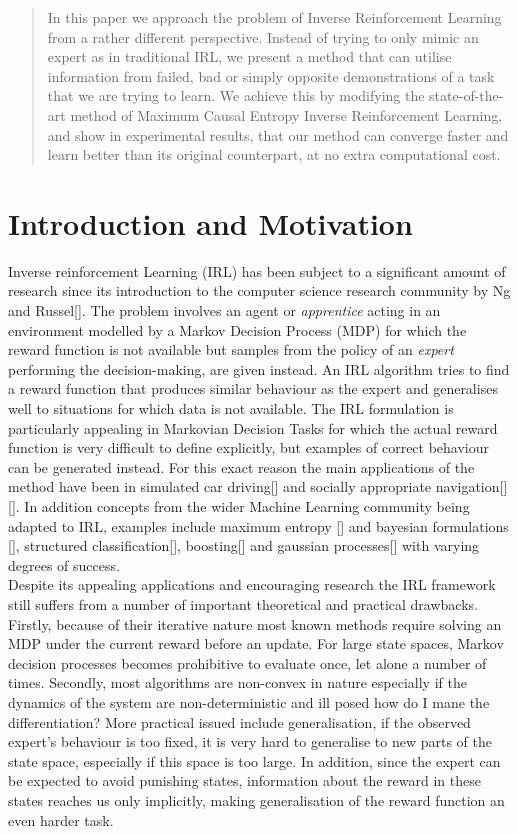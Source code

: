 \documentclass[conference]{IEEEtran}
\begin{document}
\begin{abstract}
In this paper we approach the problem of Inverse Reinforcement Learning from a rather different perspective. Instead of trying to only mimic an expert as in 
traditional IRL, we present a method that can utilise information from failed, bad or simply opposite demonstrations of a task that we are trying to learn. 
We achieve this by modifying the state-of-the-art method of Maximum Causal Entropy Inverse Reinforcement Learning, and show in experimental results, that our
method can converge faster and learn better than its original counterpart, at no extra computational cost. 
\end{abstract}

\IEEEpeerreviewmaketitle

\section{Introduction and Motivation}
Inverse reinforcement Learning (IRL) has been subject to a significant amount of research since its introduction to the computer science research community by Ng and Russel[]. The problem involves an agent or \emph{apprentice} acting in an environment modelled by a Markov Decision Process (MDP) for which the reward function is not available but samples from the policy of an \emph{expert} performing the decision-making, are given instead. An IRL algorithm tries to find a reward function that produces similar behaviour as the expert and generalises well to situations for which data is not available. The IRL formulation is particularly appealing in Markovian Decision Tasks for which the actual reward function is very difficult to define explicitly, but examples of correct behaviour can be generated instead. For this exact reason the main applications of the method have been in simulated car driving[] and socially appropriate navigation[][]. In addition concepts from the wider Machine Learning community being adapted to IRL, examples include maximum entropy [] and bayesian formulations [], structured classification[], boosting[] and gaussian processes[] with varying degrees of success.\\

Despite its appealing applications and encouraging research the IRL framework still suffers from a number of important theoretical and practical drawbacks. Firstly, because of their iterative nature most known methods require solving an MDP under the current reward before an update. For large state spaces, Markov decision processes becomes prohibitive to evaluate once, let alone a number of times. Secondly, most algorithms are non-convex in nature especially if the dynamics of the system are non-deterministic and ill posed how do I mane the differentiation? More practical issued include generalisation, if the observed expert's behaviour is too fixed, it is very hard to generalise to new parts of the state space, especially if this space is too large. In addition, since the expert can be expected to avoid punishing states, information about the reward in these states reaches us only implicitly, making generalisation of the reward function an even harder task. \\
\end{document}
